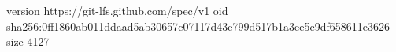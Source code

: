 version https://git-lfs.github.com/spec/v1
oid sha256:0ff1860ab011ddaad5ab30657c07117d43e799d517b1a3ee5c9df658611e3626
size 4127
